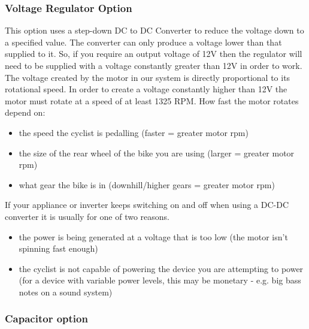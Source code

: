 \documentclass{article}
\theoremstyle{definition}
\theoremstyle{definition}
\theoremstyle{remark}
\begin{document}
    \subsubsection{Voltage Regulator Option} %
    \label{ssub:voltage_regulator_option}

      This option uses a step-down DC to DC Converter to reduce the voltage down to a specified value. The converter can only produce a voltage lower than that supplied to it. So, if you require an output voltage of 12V then the regulator will need to be supplied with a voltage constantly greater than 12V in order to work. The voltage created by the motor in our system is directly proportional to its rotational speed. In order to create a voltage constantly higher than 12V the motor must rotate at a speed of at least 1325 RPM. How fast the motor rotates depend on:

      \begin{itemize}
        \item the speed the cyclist is pedalling (faster = greater motor rpm)
        \item the size of the rear wheel of the bike you are using (larger = greater motor rpm)
        \item what gear the bike is in (downhill/higher gears = greater motor rpm)
      \end{itemize}

      If your appliance or inverter keeps switching on and off when using a DC-DC converter it is usually for one of two reasons.

      \begin{itemize}
        \item the power is being generated at a voltage that is too low (the motor isn't spinning fast enough)
        \item the cyclist is not capable of powering the device you are attempting to power (for a device with variable power levels, this may be monetary - e.g. big bass notes on a sound system)
      \end{itemize}
    

    \subsubsection{Capacitor option} %
    \label{ssub:capacitor_option}
\end{document}
